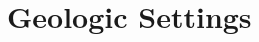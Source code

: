 \documentclass[draft]{agujournal2019}
\begin{document}


\section*{Geologic Settings}
\end{document}
